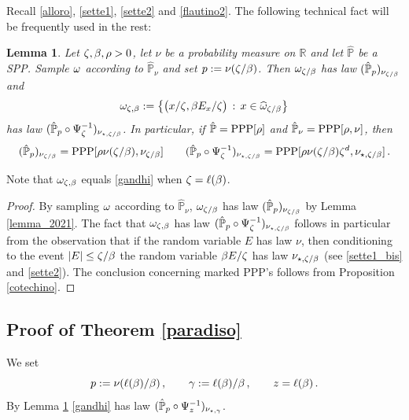 \documentclass[12pt,a4paper,reqno]{amsart}
\newtheorem{Lemma}[Theorem]{Lemma}
\newcommand{\bbP}{{\ensuremath{\mathbb P}} }
\newcommand{\bbR}{{\ensuremath{\mathbb R}} }
\newcommand{\be}{\begin{equation}}
\newcommand{\en}{\end{equation}}
\begin{document}
 

 Recall \eqref{alloro},  \eqref{sette1}, \eqref{sette2} and \eqref{flautino2}.
 The following technical fact will be frequently used in the rest:
 \begin{Lemma}
\label{fadeev_250}  Let  $\zeta,\beta,\rho >0$, let $\nu$ be a  probability measure   on $\bbR$ and let $\hat\bbP$ be a  SPP.
   Sample 
 $\omega$  according to   $\hat \bbP_\nu$ and    set  $p:=\nu( \zeta/\beta)$. 
 Then
$\omega_{\zeta/\beta}$ has law $(\hat \bbP_p)_{\nu_{\z/\b}} $ 
and 
  \be\label{box_pokemon}
  \o_{\z,\b}:=\left\{ \big (x/\z, \b E_x/\z\big) \,: \,  x\in \widehat{\o}_ {\z/\b} \right \}
\en
  has law  $(\hat \bbP_p\circ \Psi_{\z}^{-1})_{\nu_{\star,  \z/\b}}$.  In particular, if    $\hat \bbP={\rm PPP}[\rho]$ and $\hat \bbP_\nu={\rm PPP}[\rho,\nu]$, then 
 \[ 
  (\hat \bbP_p)_{\nu_{\z/\b}} ={\rm PPP}[\rho \nu(\z/\b) ,\nu_{\z/\b}]\qquad 
   (\hat \bbP_p\circ \Psi_{\z}^{-1})_{\nu_{\star,  \z/\b}}= {\rm PPP}[\rho \nu(\z/\b)\z^d   ,\nu_{\star,  \z/\b}] \,.
  \]
\end{Lemma}
Note that $\omega_{\zeta,\beta}$ equals \eqref{gandhi} when $\zeta=\ell(\beta)$.
\begin{proof}
  By sampling $\omega$ according to $\hat\bbP_\nu$, $\omega_{\zeta/\beta}$ has law $(\hat \bbP_p)_{\nu_{\z/\b}} $  by    Lemma \ref{lemma_2021}.
The fact that $\omega_{\zeta,\beta}$ has law $(\hat \bbP_p\circ \Psi_{\z}^{-1})_{\nu_{\star,  \z/\b}}$ follows  in particular from the observation that  if   the random variable  $E$ has law  $\nu$, then conditioning to the event  $|E|\leq \zeta/\beta$ the random variable 
$\beta E /\zeta $ has law $\nu_{\star,  \zeta/\beta}$ (see  \eqref{sette1_bis} and  \eqref{sette2}).
The conclusion concerning marked PPP's follows from 
 Proposition \ref{cotechino}. 
\end{proof}


\subsection{Proof of Theorem  \ref{paradiso}}\label{sec_dim_paradiso} We set
\be \label{meta}
p:=\nu( \ell(\b)/\b)\,, \qquad \g := \ell(\b)/\b\,, \qquad z = \ell (\b)\,.
\en
By Lemma \ref{fadeev_250}
  \eqref{gandhi} has law $(\hat \bbP_p \circ \Psi_z^{-1} ) _{\nu_{\star,\g}}$.
\end{document}

